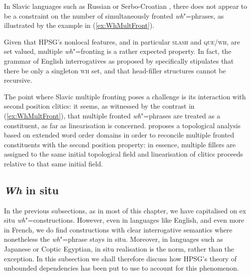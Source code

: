 \documentclass[output=paper
                ,modfonts
                ,nonflat
	        ,collection
	        ,collectionchapter
	        ,collectiontoclongg
 	        ,biblatex
                ,babelshorthands
                ,newtxmath
                ,draftmode
                ,colorlinks, citecolor=brown
]{./langsci/langscibook}
\begin{document}
{In Slavic languages such as Russian or Serbo-Croatian \citep{Penn:99},
there does not appear to be a constraint on the number of
simultaneously fronted \emph{wh}"=phrases, as illustrated by the
example in (\ref{ex:WhMultFront}).

\begin{exe}
  \ex \label{ex:WhMultFront}
  \begin{xlist}
 
  \end{xlist}
\end{exe}

\noindent
Given that HPSG's nonlocal features, and in particular \textsc{slash}
and \textsc{que/wh}, are set valued, multiple \emph{wh}"=fronting is a
rather expected property. In fact, the grammar of English
interrogatives as proposed by \citet{Ginzburg:Sag:01} specifically
stipulates that there be only a singleton \textsc{wh} set, and that
head-filler structures cannot be recursive.

The point where Slavic multiple fronting poses a challenge is its
interaction with second position clitics: it seems, as witnessed by
the contrast in (\ref{ex:WhMultFront}), that multiple fronted
\emph{wh}"=phrases are treated as a constituent, as far as
linearisation is concerned. \citet{Penn:99} proposes a topological
analysis based on extended word order domains
\citep{Reape:90,kathol_a00} in order to reconcile multiple fronted
constituents with the second position property: in essence, multiple
fillers are assigned to the same initial topological field and
linearisation of clitics proceeds relative to that same initial field.


\subsection{\emph{Wh} in situ}
\label{sec:UDC:WhInSitu}

In the previous subsections, as in most of this chapter, we have
capitalised on ex situ \emph{wh}"=constructions. However, even in
languages like English, and even more in French, we do find
constructions with clear interrogative semantics where nonetheless the
\emph{wh}"=phrase stays in situ. Moreover, in languages such as
Japanese or Coptic Egyptian, in situ realisation is the norm, rather
than the exception. In this subsection we shall therefore discuss how
HPSG's theory of unbounded dependencies has been put to use to account
for this phenomenon.

}
\end{document}
